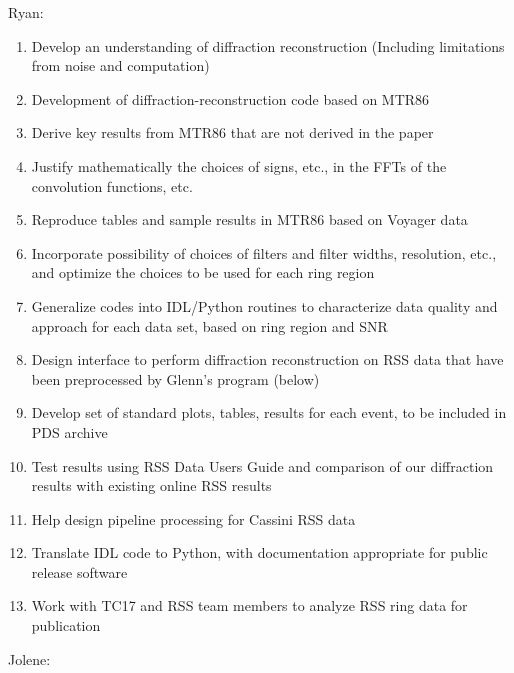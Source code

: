 \documentclass[crop=false,class=book]{standalone}
\begin{document}
Ryan:
\begin{enumerate}
    \item Develop an understanding of diffraction reconstruction (Including limitations from noise and computation)
    \item Development of diffraction-reconstruction code based on MTR86
    \item Derive key results from MTR86 that are not derived in the paper
    \item Justify mathematically the choices of signs, etc., in the FFTs of the convolution functions, etc.
    \item Reproduce tables and sample results in MTR86 based on Voyager data
    \item Incorporate possibility of choices of filters and filter widths, resolution, etc., and optimize the choices to be used for each ring region
    \item Generalize codes into IDL/Python routines to characterize data quality and approach for each data set, based on ring region and SNR
    \item Design interface to perform diffraction reconstruction on RSS data that have been preprocessed by Glenn's program (below)
    \item Develop set of standard plots, tables, results for each event, to be included in PDS archive
    \item Test results using RSS Data Users Guide and comparison of our diffraction results with existing online RSS results
    \item Help design pipeline processing for Cassini RSS data
    \item Translate IDL code to Python, with documentation appropriate for public release software
    \item Work with TC17 and RSS team members to analyze RSS ring data for publication
\end{enumerate}
Jolene:
\end{document}
